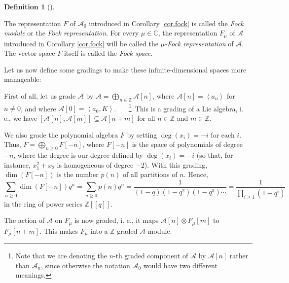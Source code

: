 \documentclass
[numbers=enddot,12pt,final,onecolumn,german,notitlepage]{scrartcl}%
\theoremstyle{definition}
\newtheorem{defi}[theo]{Definition}
\newenvironment{definition}[1][]
{\begin{defi}[#1]\begin{leftbar}}
{\end{leftbar}\end{defi}}
\begin{document}
\begin{definition}
\label{def.fock}The representation $F$ of $\mathcal{A}_{0}$ introduced in
Corollary \ref{cor.fock} is called the \textit{Fock module} or the
\textit{Fock representation}. For every $\mu\in\mathbb{C}$, the representation
$F_{\mu}$ of $\mathcal{A}$ introduced in Corollary \ref{cor.fock} will be
called the $\mu$\textit{-Fock representation} of $\mathcal{A}$. The vector
space $F$ itself is called the \textit{Fock space}.
\end{definition}

Let us now define some gradings to make these infinite-dimensional spaces more manageable:

First of all, let us grade $\mathcal{A}$ by $\mathcal{A}=\bigoplus
\limits_{n\in\mathbb{Z}}\mathcal{A}\left[  n\right]  $, where $\mathcal{A}%
\left[  n\right]  =\left\langle a_{n}\right\rangle $ for $n\neq0$, and where
$\mathcal{A}\left[  0\right]  =\left\langle a_{0},K\right\rangle $.
\ \ \ \footnote{Note that we are denoting the $n$-th graded component of
$\mathcal{A}$ by $\mathcal{A}\left[  n\right]  $ rather than $\mathcal{A}_{n}%
$, since otherwise the notation $\mathcal{A}_{0}$ would have two different
meanings.}\ This is a grading of a Lie algebra, i. e., we have $\left[
\mathcal{A}\left[  n\right]  ,\mathcal{A}\left[  m\right]  \right]
\subseteq\mathcal{A}\left[  n+m\right]  $ for all $n\in\mathbb{Z}$ and
$m\in\mathbb{Z}$.

We also grade the polynomial algebra $F$ by setting $\deg\left(  x_{i}\right)
=-i$ for each $i$. Thus, $F=\bigoplus\limits_{n\geq0}F\left[  -n\right]  $,
where $F\left[  -n\right]  $ is the space of polynomials of degree $-n$, where
the degree is our degree defined by $\deg\left(  x_{i}\right)  =-i$ (so that,
for instance, $x_{1}^{2}+x_{2}$ is homogeneous of degree $-2$). With this
grading, $\dim\left(  F\left[  -n\right]  \right)  $ is the number $p\left(
n\right)  $ of all partitions of $n$. Hence,%
\[
\sum\limits_{n\geq0}\dim\left(  F\left[  -n\right]  \right)  q^{n}%
=\sum\limits_{n\geq0}p\left(  n\right)  q^{n}=\dfrac{1}{\left(  1-q\right)
\left(  1-q^{2}\right)  \left(  1-q^{3}\right)  \cdots}=\dfrac{1}%
{\prod\limits_{i\geq1}\left(  1-q^{i}\right)  }%
\]
in the ring of power series $\mathbb{Z}\left[  \left[  q\right]  \right]  $.

The action of $\mathcal{A}$ on $F_{\mu}$ is now graded, i. e., it maps
$\mathcal{A}\left[  n\right]  \otimes F_{\mu}\left[  m\right]  $ to $F_{\mu
}\left[  n+m\right]  $. This makes $F_{\mu}$ into a $\mathbb{Z}$-graded
$\mathcal{A}$-module.
\end{document}

